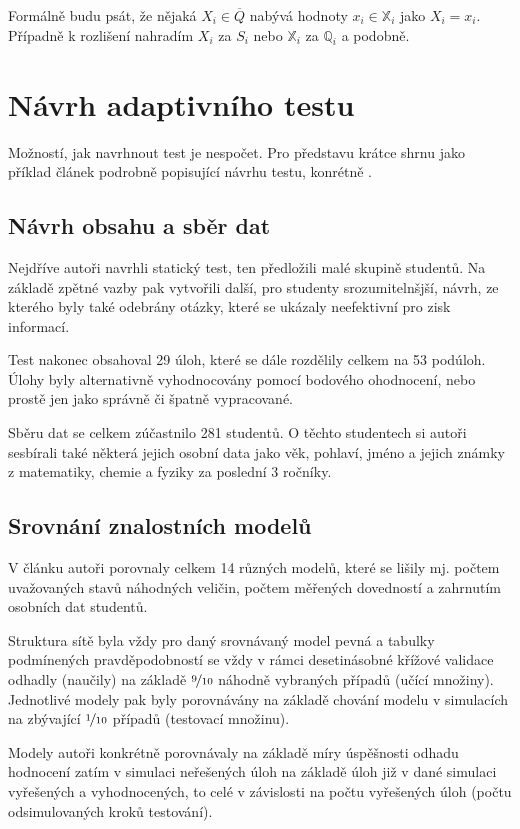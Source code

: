 \documentclass[a4paper,twoside,12pt]{book}
\begin{document}
Formálně budu psát, že nějaká $X_i \in \overline{Q}$ nabývá hodnoty $x_i \in \mathbb{X}_i$ jako $X_i = x_i$. Případně k rozlišení nahradím $X_i$ za $S_i$ nebo $\mathbb{X}_i$ za $\mathbb{Q}_i$ a podobně.


\chapter{Návrh adaptivního testu}
Možností, jak navrhnout test je nespočet. Pro představu krátce shrnu jako příklad článek podrobně popisující návrhu testu, konrétně \cite{vomlel_plajner2015}.

\section{Návrh obsahu a sběr dat}
Nejdříve autoři navrhli statický test, ten předložili malé skupině studentů. Na základě zpětné vazby pak vytvořili další, pro studenty srozumitelnšjší, návrh, ze kterého byly také odebrány otázky, které se ukázaly neefektivní pro zisk informací.

Test nakonec obsahoval 29 úloh, které se dále rozdělily celkem na 53 podúloh. Úlohy byly alternativně vyhodnocovány pomocí bodového ohodnocení, nebo prostě jen jako správně či špatně vypracované.

Sběru dat se celkem zúčastnilo 281 studentů. O těchto studentech si autoři sesbírali také některá jejich osobní data jako věk, pohlaví, jméno a jejich známky z matematiky, chemie a fyziky za poslední 3 ročníky.


\section{Srovnání znalostních modelů}
V článku autoři porovnaly celkem 14 různých modelů, které se lišily mj. počtem uvažovaných stavů náhodných veličin, počtem měřených dovedností a zahrnutím osobních dat studentů.

Struktura sítě byla vždy pro daný srovnávaný model pevná a tabulky podmínených pravděpodobností se vždy v rámci desetinásobné křížové validace odhadly (naučily) na základě $\nicefrac{9}{10}$ náhodně vybraných případů (učící množiny). Jednotlivé modely pak byly porovnávány na základě chování modelu v simulacích na zbývající $\nicefrac{1}{10}$ případů (testovací množinu).

Modely autoři konkrétně porovnávaly na základě míry úspěšnosti odhadu hodnocení zatím v simulaci neřešených úloh na základě úloh již v dané simulaci vyřešených a vyhodnocených, to celé v závislosti na počtu vyřešených úloh (počtu odsimulovaných kroků testování).
\end{document}
